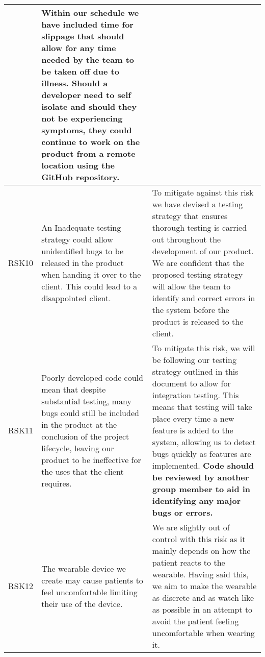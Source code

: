 \begin{xltabular}[H]{1.4\textwidth}{p{0.1\textwidth} | p{0.4\textwidth} | p{0.9\textwidth}}
    &

    Within our schedule we have included time for slippage that should allow for any time needed by the team to be taken off due to illness. Should a developer need to self isolate and should they not be experiencing symptoms, they could continue to work on the product from a remote location using the GitHub repository.\\

    \midrule

    RSK10

    &

    An Inadequate testing strategy could allow unidentified bugs to be released in the product when handing it over to the client. This could lead to a disappointed client.

    &

    To mitigate against this risk we have devised a testing strategy that ensures thorough testing is carried out throughout the development of our product. We are confident that the proposed testing strategy will allow the team to identify and correct errors in the system before the product is released to the client. \\

    \midrule

    RSK11

    &

    Poorly developed code could mean that despite substantial testing, many bugs could still be included in the product at the conclusion of the project lifecycle, leaving our product to be ineffective for the uses that the client requires.

    &

    To mitigate this risk, we will be following our testing strategy outlined in this document to allow for integration testing. This means that testing will take place every time a new feature is added to the system, allowing us to detect bugs quickly as features are implemented. \textbf{Code should be reviewed by another group member to aid in identifying any major bugs or errors.}\\

    \midrule

    RSK12

    &

    The wearable device we create may cause patients to feel uncomfortable limiting their use of the device.

    &

    We are slightly out of control with this risk as it mainly depends on how the patient reacts to the wearable. Having said this, we aim to make the wearable as discrete and as watch like as possible in an attempt to avoid the patient feeling uncomfortable when wearing it.\\


\end{xltabular}
